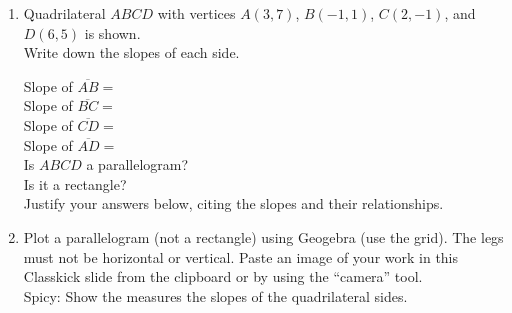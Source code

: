\documentclass[12pt, twoside]{article}
\begin{document}
\begin{enumerate}
\newpage
\item Quadrilateral $ABCD$ with vertices $A(3,7)$, $B(-1,1)$, $C(2,-1)$, and $D(6,5)$ is shown. \\[0.5cm]
Write down the slopes of each side.
\begin{multicols}{2}
  Slope of $\overline{AB}=$\\[0.8cm]
  Slope of $\overline{BC}=$\\[0.8cm]
  Slope of $\overline{CD}=$\\[0.8cm]
  Slope of $\overline{AD}=$\\[0.8cm]
  Is $ABCD$ a parallelogram? \\[0.8cm]
  Is it a rectangle? \\[0.8cm]
  Justify your answers below, citing the slopes and their relationships.
  \begin{flushright}
    \end{flushright}
  \end{multicols}

\newpage 
\item Plot a parallelogram (not a rectangle) using Geogebra (use the grid). The legs must not be horizontal or vertical. Paste an image of your work in this Classkick slide from the clipboard or by using the ``camera'' tool.\\[0.25cm]
Spicy: Show the measures the slopes of the quadrilateral sides.


\end{enumerate}
\end{document}
